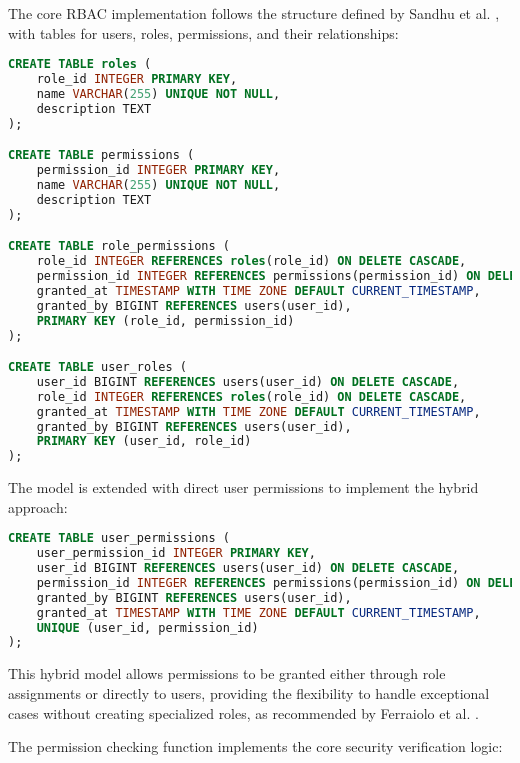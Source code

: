 The core \ac{RBAC} implementation follows the structure defined by Sandhu et al. \cite{sandhu1998role}, with tables for users, roles, permissions, and their relationships:

\begin{lstlisting}[language=SQL, caption={Core RBAC Implementation}, label={lst:rbac-implementation}]
CREATE TABLE roles (
    role_id INTEGER PRIMARY KEY,
    name VARCHAR(255) UNIQUE NOT NULL,
    description TEXT
);

CREATE TABLE permissions (
    permission_id INTEGER PRIMARY KEY,
    name VARCHAR(255) UNIQUE NOT NULL,
    description TEXT
);

CREATE TABLE role_permissions (
    role_id INTEGER REFERENCES roles(role_id) ON DELETE CASCADE,
    permission_id INTEGER REFERENCES permissions(permission_id) ON DELETE CASCADE,
    granted_at TIMESTAMP WITH TIME ZONE DEFAULT CURRENT_TIMESTAMP,
    granted_by BIGINT REFERENCES users(user_id),
    PRIMARY KEY (role_id, permission_id)
);

CREATE TABLE user_roles (
    user_id BIGINT REFERENCES users(user_id) ON DELETE CASCADE,
    role_id INTEGER REFERENCES roles(role_id) ON DELETE CASCADE,
    granted_at TIMESTAMP WITH TIME ZONE DEFAULT CURRENT_TIMESTAMP,
    granted_by BIGINT REFERENCES users(user_id),
    PRIMARY KEY (user_id, role_id)
);
\end{lstlisting}

The model is extended with direct user permissions to implement the hybrid approach:

\begin{lstlisting}[language=SQL, caption={User-Permission Implementation}, label={lst:user-permission}]
CREATE TABLE user_permissions (
    user_permission_id INTEGER PRIMARY KEY,
    user_id BIGINT REFERENCES users(user_id) ON DELETE CASCADE,
    permission_id INTEGER REFERENCES permissions(permission_id) ON DELETE CASCADE,
    granted_by BIGINT REFERENCES users(user_id),
    granted_at TIMESTAMP WITH TIME ZONE DEFAULT CURRENT_TIMESTAMP,
    UNIQUE (user_id, permission_id)
);
\end{lstlisting}

This hybrid model allows permissions to be granted either through role assignments or directly to users, providing the flexibility to handle exceptional cases without creating specialized roles, as recommended by Ferraiolo et al. \cite{ferraiolo2011policy}.

The permission checking function implements the core security verification logic:

